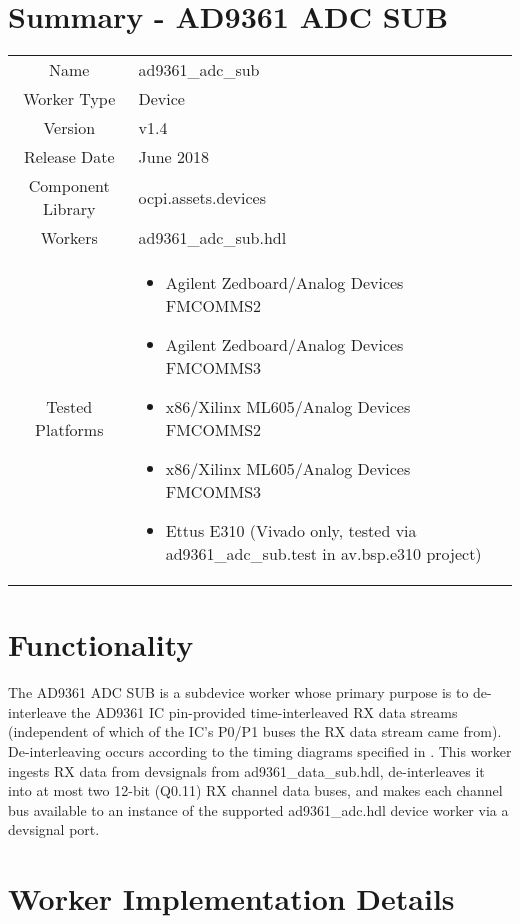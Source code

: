 \documentclass{article}
\author{} %
\date{Version \docVersion} %
\title{\docTitle}
\def\docVersion{1.4}
\def\comp{ad9361\_adc\_sub}
\def\Comp{AD9361 ADC SUB}
\begin{document}
\section*{Summary - \Comp}
\begin{tabular}{|c|M{13.5cm}|}
	\hline
	                  &                  \\
	\hline
	Name              & \comp            \\
	\hline
	Worker Type       & Device           \\
	\hline
	Version           & v\docVersion     \\
	\hline
	Release Date      & June 2018         \\
	\hline
	Component Library & ocpi.assets.devices     \\
	\hline
	Workers           & \comp.hdl        \\
	\hline
	Tested Platforms  &
\begin{itemize}
  \item Agilent Zedboard/Analog Devices FMCOMMS2
  \item Agilent Zedboard/Analog Devices FMCOMMS3
  \item x86/Xilinx ML605/Analog Devices FMCOMMS2
  \item x86/Xilinx ML605/Analog Devices FMCOMMS3
  \item Ettus E310 (Vivado only, tested via \comp{}.test in av.bsp.e310 project)
\end{itemize} \\
	\hline
\end{tabular}

\section*{Functionality}
	The \Comp{} is a subdevice worker whose primary purpose is to de-interleave the AD9361 IC pin-provided time-interleaved RX data streams (independent of which of the IC's P0/P1 buses the RX data stream came from). De-interleaving occurs according to the timing diagrams specified in \cite{adi_ug570}. This worker ingests RX data from devsignals from ad9361\_data\_sub.hdl\cite{data_sub_comp_datasheet}, de-interleaves it into at most two 12-bit (Q0.11) RX channel data buses, and makes each channel bus available to an instance of the supported ad9361\_adc.hdl device worker via a devsignal port.

\section*{Worker Implementation Details}
\end{document}
